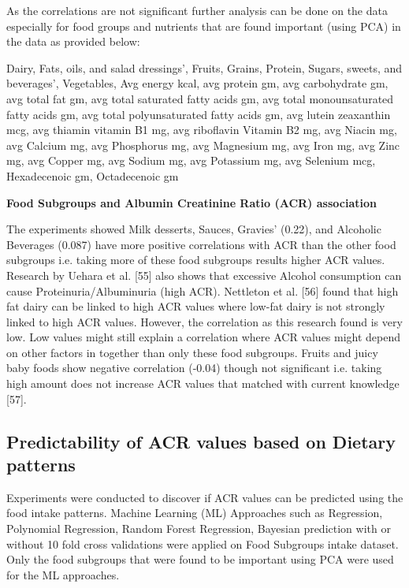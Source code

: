 \medskip 
\noindent As the correlations are not significant further analysis can be done on the data especially for food groups and nutrients that are found important (using PCA) in the data as provided below:


\medskip  
\noindent Dairy,  Fats, oils, and salad dressings’,  Fruits,  Grains,  Protein,   Sugars, sweets, and beverages’, Vegetables, Avg energy kcal,  avg protein gm,  avg carbohydrate gm,  avg total fat gm,  avg total saturated fatty acids gm, avg total monounsaturated fatty acids gm,  avg total polyunsaturated fatty acids gm, avg lutein zeaxanthin mcg,  avg thiamin vitamin B1 mg,  avg riboflavin Vitamin B2 mg,  avg Niacin mg, avg Calcium mg,  avg Phosphorus mg,  avg Magnesium mg,  avg Iron mg, avg Zinc mg,  avg Copper mg,  avg Sodium mg,  avg Potassium mg,  avg Selenium mcg,  Hexadecenoic gm,  Octadecenoic gm

\medskip 
\noindent \textbf{Food Subgroups and Albumin Creatinine Ratio (ACR) association}


\noindent The experiments showed  Milk desserts, Sauces, Gravies’ (0.22), and Alcoholic Beverages (0.087) have more positive correlations with ACR than the other food subgroups  i.e. taking more of these food subgroups results higher ACR values. Research by Uehara et al. [55] also shows that excessive Alcohol consumption can cause Proteinuria/Albuminuria (high ACR). Nettleton et al. [56] found that high fat dairy can be linked to high ACR values where low-fat dairy is not strongly linked to high ACR values. However, the correlation as this research found is very low. Low values might still explain a correlation where ACR values might depend on other factors in together than only these food subgroups. Fruits and juicy baby foods show negative correlation (-0.04) though not significant i.e. taking high amount does not increase ACR values that matched with current knowledge [57].

\subsection{\textbf{Predictability of ACR values based on Dietary patterns}}
Experiments were conducted to discover if ACR values can be predicted using the food intake patterns. Machine Learning (ML) Approaches such as Regression, Polynomial Regression, Random Forest Regression, Bayesian prediction with or without 10 fold cross validations were applied on Food Subgroups intake dataset. Only the food subgroups that were found to be important using PCA were used for the ML approaches.


